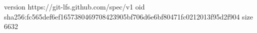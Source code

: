 version https://git-lfs.github.com/spec/v1
oid sha256:fc565def6ef1657380469708423905bf706d6e6bf80471fc0212013f95d2f904
size 6632
